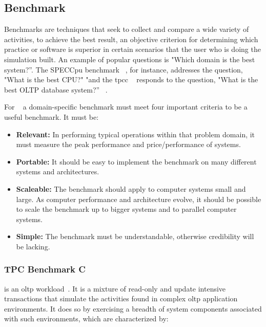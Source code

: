 
\subsection{Benchmark}

Benchmarks are techniques that seek to collect and compare a wide variety of activities, to achieve the best result, an objective criterion for determining which practice or software is superior in certain scenarios that the user who
is doing the simulation built. An example of popular questions is "Which domain is the best system?”. The SPECCpu benchmark ~\cite{henning2006spec}, for instance, addresses the question, "What is the best CPU?" "and the \gls{tpcc} ~\cite{council2010tpc} responds to the question, "What is the best OLTP database system?” ~\cite{benchmarkchen}.

For ~\citeauthor{gray} a domain-specific benchmark must meet four important criteria to be a useful benchmark. It must be:

\begin{itemize}
    \item \textbf{Relevant:} In performing typical operations within that problem domain, it must measure the peak performance and price/performance of systems. 
    \item \textbf{Portable:} It should be easy to implement the benchmark on many different systems and architectures.
    \item \textbf{Scaleable:}  The benchmark should apply to computer systems small and large. As computer performance and architecture evolve, it should be possible to scale the benchmark up to bigger systems and to parallel computer systems.
    \item \textbf{Simple:} The benchmark must be understandable, otherwise credibility will be lacking.
\end{itemize}




\subsubsection{TPC Benchmark C}
 is an \gls{oltp} workload~\cite{council2010tpc}. It is a mixture of read-only and update intensive transactions that simulate the activities found in complex \gls{oltp} application environments. It does so by exercising a breadth of system components associated with such environments, which are characterized by:

